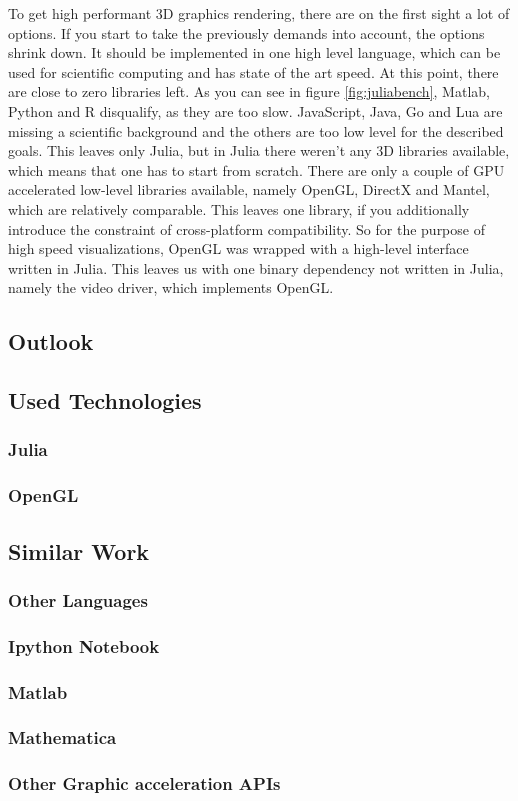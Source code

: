 To get high performant 3D graphics rendering, there are on the first sight a lot of options.
If you start to take the previously demands into account, the options shrink down.
It should be implemented in one high level language, which can be used for scientific computing and has state of the art speed. At this point, there are close to zero libraries left. As you can see in figure \ref{fig:juliabench}, Matlab, Python and R disqualify, as they are too slow. JavaScript, Java, Go and Lua are missing a scientific background and the others are too low level for the described goals.
This leaves only Julia, but in Julia there weren't any 3D libraries available, which means that one has to start from scratch.
There are only a couple of GPU accelerated low-level libraries available, namely OpenGL, DirectX and Mantel, which are relatively comparable. This leaves one library, if you additionally introduce the constraint of cross-platform compatibility.
So for the purpose of high speed visualizations, OpenGL was wrapped with a high-level interface written in Julia. This leaves us with one binary dependency not written in Julia, namely the video driver, which implements OpenGL.

\subsection{Outlook}

\subsection{Used Technologies}

\subsubsection{Julia}
\subsubsection{OpenGL}


\subsection{Similar Work}

\subsubsection{Other Languages}
\subsubsection{Ipython Notebook}
\subsubsection{Matlab}
\subsubsection{Mathematica}
\subsubsection{Other Graphic acceleration APIs}